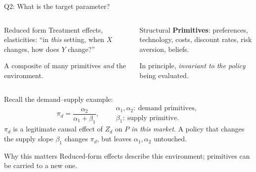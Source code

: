 \documentclass[aspectratio=169,11pt]{beamer}
\begin{document}
\begin{frame}{Q2: What is the target parameter?}

\begin{columns}[T]

\begin{block}{Reduced form}
Treatment effects, elasticities:
``in \emph{this} setting, when $X$ changes, how does $Y$ change?''

\vspace{0.2em}

A composite of many primitives \emph{and} the environment.
\end{block}

\begin{block}{Structural}
\textbf{Primitives}: preferences, technology, costs,
discount rates, risk aversion, beliefs.

\vspace{0.2em}

In principle, \emph{invariant to the policy} being evaluated.
\end{block}

\end{columns}

\vspace{0.5em}

Recall the demand--supply example:
\[
\pi_d=\frac{\alpha_2}{\alpha_1+\beta_1},
\qquad
\begin{array}{l}
\alpha_1,\alpha_2:\ \text{demand primitives},\\
\beta_1:\ \text{supply primitive}.
\end{array}
\]
$\pi_d$ is a legitimate causal effect of $Z_d$ on $P$ \emph{in this market}.
A policy that changes the supply slope $\beta_1$ changes $\pi_d$,
but leaves $\alpha_1,\alpha_2$ untouched.

\vspace{0.3em}

\begin{alertblock}{Why this matters}
Reduced-form effects describe this environment;
primitives can be carried to a new one.
\end{alertblock}

\end{frame}
\end{document}

